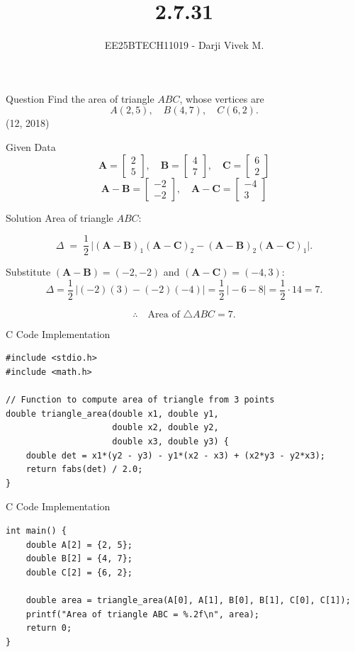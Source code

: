 \documentclass{beamer}
\title{2.7.31}
\author{EE25BTECH11019 - Darji Vivek M.}
\date{}
\renewcommand{\vec}[1]{\mathbf{#1}}
\begin{document}
\frame{\titlepage}

\begin{frame}{Question}
Find the area of triangle $ABC$, whose vertices are
\[
A(2,5), \quad B(4,7), \quad C(6,2).
\]
\hfill (12, 2018)
\end{frame}

\begin{frame}{Given Data}
\[
\vec{A} = \begin{bmatrix}2\\5\end{bmatrix}, \quad 
\vec{B} = \begin{bmatrix}4\\7\end{bmatrix}, \quad 
\vec{C} = \begin{bmatrix}6\\2\end{bmatrix}
\]
\[
\vec{A}-\vec{B}=\begin{bmatrix}-2\\-2\end{bmatrix},\quad 
\vec{A}-\vec{C}=\begin{bmatrix}-4\\3\end{bmatrix}
\]
\end{frame}

\begin{frame}{Solution}
Area of triangle \(ABC\):

\[
\Delta \;=\; \frac{1}{2}\,\big|(\vec{A}-\vec{B})_1(\vec{A}-\vec{C})_2
    - (\vec{A}-\vec{B})_2(\vec{A}-\vec{C})_1\big|.
\]

Substitute \((\vec{A}-\vec{B}) = (-2,-2)\) and \((\vec{A}-\vec{C}) = (-4,3)\):
\[
\Delta = \frac{1}{2}\,\big|(-2)(3) - (-2)(-4)\big|
       = \frac{1}{2}\,\big|-6 - 8\big|
       = \frac{1}{2}\cdot 14 = 7.
\]

\[
\therefore \quad \text{Area of } \triangle ABC = 7.
\]
\end{frame}

\begin{frame}[fragile]{C Code Implementation}
\begin{lstlisting}
#include <stdio.h>
#include <math.h>

// Function to compute area of triangle from 3 points
double triangle_area(double x1, double y1,
                     double x2, double y2,
                     double x3, double y3) {
    double det = x1*(y2 - y3) - y1*(x2 - x3) + (x2*y3 - y2*x3);
    return fabs(det) / 2.0;
}
\end{lstlisting}
\end{frame}
\begin{frame}[fragile]{C Code Implementation}
\begin{lstlisting}
int main() {
    double A[2] = {2, 5};
    double B[2] = {4, 7};
    double C[2] = {6, 2};

    double area = triangle_area(A[0], A[1], B[0], B[1], C[0], C[1]);
    printf("Area of triangle ABC = %.2f\n", area);
    return 0;
}
\end{lstlisting}
\end{frame}
\end{document}
